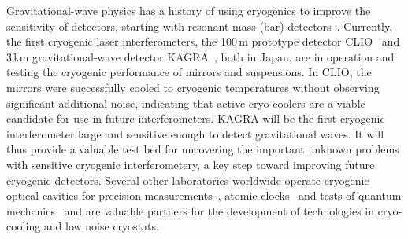 Gravitational-wave physics has a history of using cryogenics to improve the sensitivity of detectors, starting with resonant mass (bar) detectors~\cite{ColdBars}. Currently, the first cryogenic laser interferometers, the 100\,m prototype detector CLIO~\cite{CLIO:2008} and 3\,km gravitational-wave detector KAGRA~\cite{KAGRA2013}, both in Japan, are in operation and testing the cryogenic performance of mirrors and suspensions. 
In CLIO, the mirrors were successfully cooled to cryogenic temperatures without observing significant additional noise, indicating that active cryo-coolers are a viable candidate for use in future interferometers. KAGRA will be the first cryogenic interferometer large and sensitive enough to detect gravitational waves. It will thus provide a valuable test bed for uncovering the important unknown problems with sensitive cryogenic interferometery, a key step toward improving future cryogenic detectors. Several other laboratories worldwide operate cryogenic optical cavities for precision measurements~\cite{Mueller:03}, atomic clocks~\cite{JunYeGroup:2019} and tests of quantum mechanics~\cite{CaltechIQIM} and are valuable partners for the development of technologies in cryo-cooling and low noise cryostats. 



